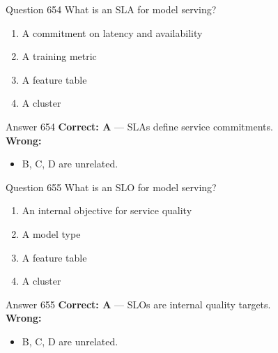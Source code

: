 \documentclass[aspectratio=169,11pt]{beamer}
\begin{document}
	\begin{frame}{Question 654}
		What is an SLA for model serving?
		\begin{enumerate}[label=\Alph*.]
			\item A commitment on latency and availability
			\item A training metric
			\item A feature table
			\item A cluster
		\end{enumerate}
	\end{frame}
	\begin{frame}{Answer 654}
		\textbf{Correct: A} --- SLAs define service commitments.\\
		\vspace{0.5em}
		\textbf{Wrong:}
		\begin{itemize}
			\item B, C, D are unrelated.
		\end{itemize}
	\end{frame}
	
	\begin{frame}{Question 655}
		What is an SLO for model serving?
		\begin{enumerate}[label=\Alph*.]
			\item An internal objective for service quality
			\item A model type
			\item A feature table
			\item A cluster
		\end{enumerate}
	\end{frame}
	\begin{frame}{Answer 655}
		\textbf{Correct: A} --- SLOs are internal quality targets.\\
		\vspace{0.5em}
		\textbf{Wrong:}
		\begin{itemize}
			\item B, C, D are unrelated.
		\end{itemize}
	\end{frame}
	
\end{document}
